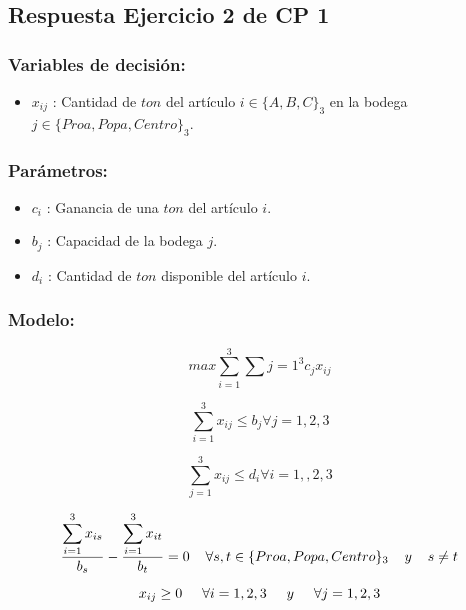 \documentclass[]{article}
\begin{document}
\subsection*{Respuesta Ejercicio 2 de CP 1}

\subsubsection*{Variables de decisi\'on:}

\begin{itemize}
	\item $x_{ij}$ : Cantidad de $ton$ del art\'iculo $i\in\{A,B,C\}_3$ en la bodega $j\in\{Proa, Popa, Centro\}_3$.
\end{itemize}

\subsubsection*{Par\'ametros:}

\begin{itemize}
	\item $c_i$ : Ganancia de una $ton$ del art\'iculo $i$.
	\item $b_j$ : Capacidad de la bodega $j$.
	\item $d_i$ : Cantidad de $ton$ disponible del art\'iculo $i$.
\end{itemize}

\subsubsection*{Modelo:}

	$$ max \sum_{i=1}^3\sum{j=1}^3 c_j x_{ij} $$

	$$ \sum_{i=1}^3 x_{ij}\leq b_j \forall j = 1,2,3 $$

	$$ \sum_{j=1}^3 x_{ij}\leq d_i \forall i = 1,,2,3 $$
	
	$$\displaystyle \frac{\displaystyle \sum_{i=1}^3 x_{is}}{b_s} - \frac{\displaystyle \sum_{i=1}^3 x_{it}}{b_t} = 0  \hspace{0.4cm}\forall s,t\in \{Proa,Popa,Centro\}_3 \hspace{0.4cm} y \hspace{0.4cm} s \neq t $$

	$$ x_{ij} \geq 0 \hspace{0.5cm} \forall i =1,2,3 \hspace{0.5cm} y \hspace{0.5cm}  \forall j = 1,2,3 $$
\end{document}
